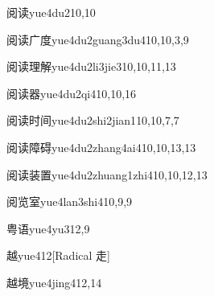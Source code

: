 \begin{verbete}{阅读}{yue4du2}{10,10}
\end{verbete}

\begin{verbete}{阅读广度}{yue4du2guang3du4}{10,10,3,9}
\end{verbete}

\begin{verbete}{阅读理解}{yue4du2li3jie3}{10,10,11,13}
\end{verbete}

\begin{verbete}{阅读器}{yue4du2qi4}{10,10,16}
\end{verbete}

\begin{verbete}{阅读时间}{yue4du2shi2jian1}{10,10,7,7}
\end{verbete}

\begin{verbete}{阅读障碍}{yue4du2zhang4ai4}{10,10,13,13}
\end{verbete}

\begin{verbete}{阅读装置}{yue4du2zhuang1zhi4}{10,10,12,13}
\end{verbete}

\begin{verbete}{阅览室}{yue4lan3shi4}{10,9,9}
\end{verbete}

\begin{verbete}{粤语}{yue4yu3}{12,9}
\end{verbete}

\begin{verbete}{越}{yue4}{12}[Radical 走]
\end{verbete}

\begin{verbete}{越境}{yue4jing4}{12,14}
\end{verbete}

